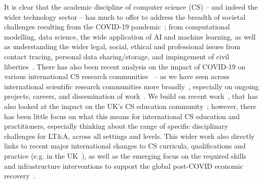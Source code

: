\documentclass[conference]{IEEEtran}
\begin{document}



It is clear that the academic discipline of computer science (CS) --
and indeed the wider technology sector -- has much to offer to address
the breadth of societal challenges resulting from the COVID-19
pandemic~\cite{calder-et-al:2021}; from computational modelling, data
science, the wide application of AI and machine learning, as well as
understanding the wider legal, social, ethical and professional issues
from contact tracing, personal data sharing/storage, and impingement
of civil
liberties~\cite{dwivedi-et-al:ijim2019,ting-et-al:2020,cerf:2020,chun-et-al:2020,rcjbbcnews:2020,zhigljavsky-et-al:2020}. There
has also been recent analysis on the impact of COVID-19 on various
international CS research
communities~\cite{cracovid:2020,crick-et-alposter:sigcse2021} -- as we
have seen across international scientific research communities more
broadly~\cite{oecdcovid19:2020}, especially on ongoing projects,
careers, and dissemination of work~\cite{msrcovid19:2020}. We build on
recent work~\cite{watermeyer-et-al:he2020}, that has also looked at
the impact on the UK's CS education
community~\cite{crick-et-al:ukicer2020}; however, there has been
little focus on what this means for international CS education and
practitioners, especially thinking about the range of specific
disciplinary challenges for LT\&A, across all settings and
levels. This wider work also directly links to recent major
international changes to CS curricula, qualifications
and practice (e.g. in the
UK~\cite{brown-et-al-sigcse2013,brown-et-al-toce2014}), as well as the
emerging focus on the required skills and infrastructure interventions
to support the global post-COVID economic
recovery~\cite{davenport-et-al:educon2020,euparl:2020,mckinsey:2020}.

\end{document}
